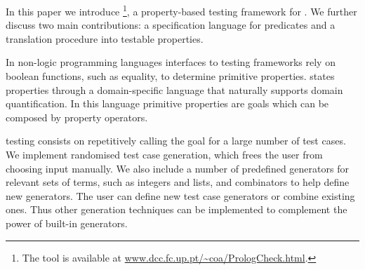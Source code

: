 In this paper we introduce \plqc{}\footnote{The \plqc{} tool is available at \url{www.dcc.fc.up.pt/~coa/PrologCheck.html}.},
a property-based testing framework for \Prolog{}.
%
We further discuss two main contributions: a specification language for \Prolog{} predicates
and a translation procedure into testable properties.





%
In non-logic programming languages interfaces to testing frameworks rely
on boolean functions, such as equality, to determine primitive properties. %
%
%
\plqc{} states properties through a domain-specific language that
naturally supports domain quantification.
%
In this language primitive properties are %
\Prolog{} goals which can be composed by \plqc{}
property operators. %



%
%
\plqc{} testing consists on repetitively calling the goal for a large number of
test cases.
%
%
%
We implement randomised test case generation, which frees the user
from choosing input manually.
%
We also include a number of predefined generators for relevant sets of
terms, such as integers and lists, and combinators to help define new
generators.
%
The user can define new test case generators or combine
existing ones.
%
Thus other generation techniques
\cite{naylor2007logic,runciman2008smallcheck,Duregard-2012-feat} can be
implemented  to complement the power of built-in generators.
%

